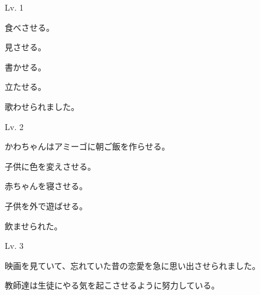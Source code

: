 
\author{Kristijan Čavić}

	
	\begin{mondai}{Lv. 1}
		\item 食べさせる。
		\item 見させる。
		\item 書かせる。
		\item 立たせる。
		\item 歌わせられました。
	\end{mondai}
	
	\begin{mondai}{Lv. 2}
		\item かわちゃんはアミーゴに朝ご飯を作らせる。
		\item 子供に色を変えさせる。
		\item 赤ちゃんを寝させる。
		\item 子供を外で遊ばせる。
		\item 飲ませられた。
	\end{mondai}
	
	\begin{mondai}{Lv. 3}
		\item 映画を見ていて、忘れていた昔の恋愛を急に思い出させられました。
		\item 教師達は生徒にやる気を起こさせるように努力している。
	\end{mondai}
